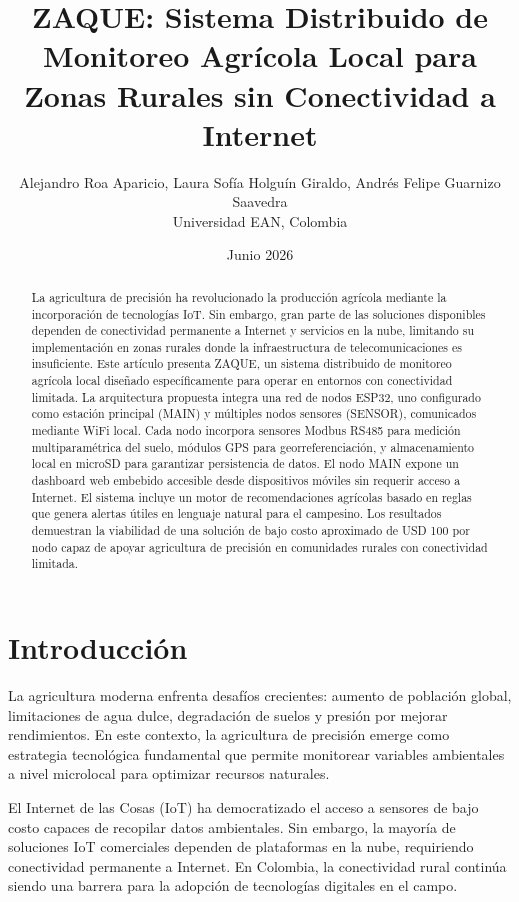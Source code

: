 \documentclass[journal]{IEEEtran}
\title{ZAQUE: Sistema Distribuido de Monitoreo Agrícola Local para Zonas Rurales sin Conectividad a Internet}
\author{
Alejandro Roa Aparicio, Laura Sofía Holguín Giraldo, Andrés Felipe Guarnizo Saavedra\\
Universidad EAN, Colombia
}
\date{Junio 2026}
\begin{document}
\maketitle

\begin{abstract}
La agricultura de precisión ha revolucionado la producción agrícola mediante la incorporación de tecnologías IoT. Sin embargo, gran parte de las soluciones disponibles dependen de conectividad permanente a Internet y servicios en la nube, limitando su implementación en zonas rurales donde la infraestructura de telecomunicaciones es insuficiente. Este artículo presenta ZAQUE, un sistema distribuido de monitoreo agrícola local diseñado específicamente para operar en entornos con conectividad limitada. La arquitectura propuesta integra una red de nodos ESP32, uno configurado como estación principal (MAIN) y múltiples nodos sensores (SENSOR), comunicados mediante WiFi local. Cada nodo incorpora sensores Modbus RS485 para medición multiparamétrica del suelo, módulos GPS para georreferenciación, y almacenamiento local en microSD para garantizar persistencia de datos. El nodo MAIN expone un dashboard web embebido accesible desde dispositivos móviles sin requerir acceso a Internet. El sistema incluye un motor de recomendaciones agrícolas basado en reglas que genera alertas útiles en lenguaje natural para el campesino. Los resultados demuestran la viabilidad de una solución de bajo costo aproximado de USD 100 por nodo capaz de apoyar agricultura de precisión en comunidades rurales con conectividad limitada.
\end{abstract}

\section{Introducción}

La agricultura moderna enfrenta desafíos crecientes: aumento de población global, limitaciones de agua dulce, degradación de suelos y presión por mejorar rendimientos. En este contexto, la agricultura de precisión emerge como estrategia tecnológica fundamental que permite monitorear variables ambientales a nivel microlocal para optimizar recursos naturales.

El Internet de las Cosas (IoT) ha democratizado el acceso a sensores de bajo costo capaces de recopilar datos ambientales. Sin embargo, la mayoría de soluciones IoT comerciales dependen de plataformas en la nube, requiriendo conectividad permanente a Internet. En Colombia, la conectividad rural continúa siendo una barrera para la adopción de tecnologías digitales en el campo.
\end{document}
